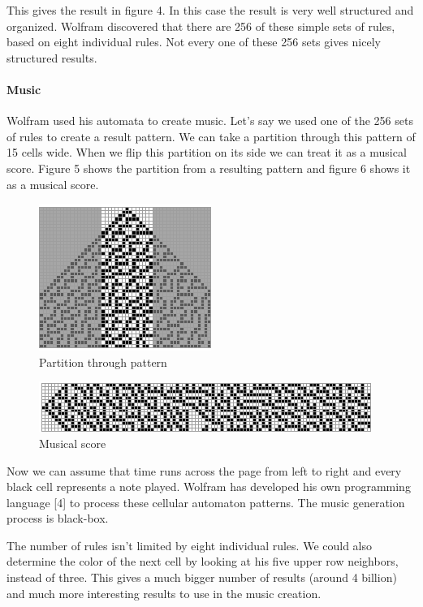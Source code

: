 \documentclass[12pt]{article}
\begin{document}
This gives the result in figure 4. In this case the result is very well structured and organized. Wolfram discovered that there are 256 of these simple sets of rules, based on eight individual rules. Not every one of these 256 sets gives nicely structured results.

\paragraph{Music}

Wolfram used his automata to create music. Let's say we used one of the 256 sets of rules to create a result pattern. We can take a partition through this pattern of 15 cells wide. When we flip this partition on its side we can treat it as a musical score.
Figure 5 shows the partition from a resulting pattern and figure 6 shows it as a musical score.
\newline

 \begin{figure}[h]
\centering
\includegraphics[]{img/wolframMusic1}
\caption{Partition through pattern}
\end{figure}

\begin{figure}[h]
\centering
\includegraphics[]{img/wolframMusic2}
\caption{Musical score}
\end{figure}

Now we can assume that time runs across the page from left to right and every black cell represents a note played. Wolfram has developed his own programming language [4] to process these cellular automaton patterns. The music generation process is black-box.
\newline

The number of rules isn't limited by eight individual rules. We could also determine the color of the next cell by looking at his five upper row neighbors, instead of three. This gives a much bigger number of results (around 4 billion) and much more interesting results to use in the music creation. 
\end{document}
